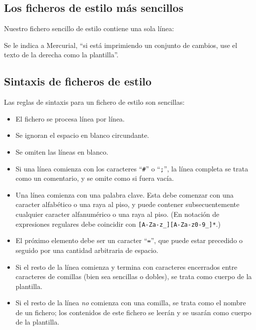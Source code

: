 {{\subsection{Los ficheros de estilo más sencillos}

Nuestro fichero sencillo de estilo contiene una sola línea:


Se le indica a Mercurial, ``si está imprimiendo un conjunto de
cambios, use el texto de la derecha como la plantilla''.

\subsection{Sintaxis de ficheros de estilo}

Las reglas de sintaxis para un fichero de estilo son sencillas:

\begin{itemize}
\item El fichero se procesa línea por línea.

\item Se ignoran el espacio en blanco circundante.

\item Se omiten las líneas en blanco.

\item Si una línea comienza con los caracteres ``\texttt{\#}'' o
  ``\texttt{;}'', la línea completa se trata como un comentario, y se
  omite como si fuera vacía.

\item Una línea comienza con una palabra clave.  Esta debe comenzar
  con una caracter alfabético o una raya al piso, y puede contener
  subsecuentemente cualquier caracter alfanumérico o una raya al
  piso.  (En notación de expresiones regulares debe coincidir con
  \Verb+[A-Za-z_][A-Za-z0-9_]*+.)

\item El próximo elemento debe ser un caracter ``\texttt{=}'', que
  puede estar precedido o seguido por una cantidad arbitraria de
  espacio.

\item Si el resto de la línea comienza y termina con caracteres
  encerrados entre caracteres de comillas (bien sea sencillas o
  dobles),  se trata como cuerpo de la plantilla.

\item Si el resto de la línea \emph{no} comienza con una comilla, se
  trata como el nombre de un fichero; los contenidos de este fichero
  se leerán y se usarán como cuerpo de la plantilla.
\end{itemize}

}}
